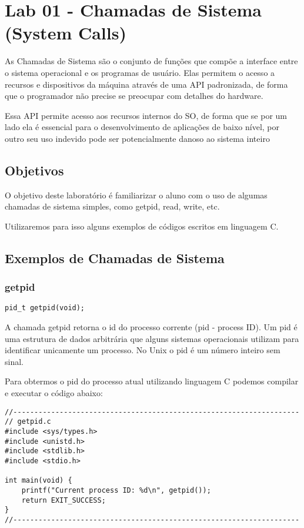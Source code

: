 \chapter{Lab 01 - Chamadas de Sistema (System Calls)}

As Chamadas de Sistema são o conjunto de funções que compõe a interface entre o sistema operacional e os programas de usuário. Elas permitem o acesso a recursos e dispositivos da máquina através de uma API padronizada, de forma que o programador não precise se preocupar com detalhes do hardware.

Essa API permite acesso aos recursos internos do SO, de forma que se por um lado ela é essencial para o desenvolvimento de aplicações de baixo nível, por outro seu uso indevido pode ser potencialmente danoso ao sistema inteiro \cite{Mitchell}

\section{Objetivos}

O objetivo deste laboratório é familiarizar o aluno com o uso de algumas chamadas de sistema simples, como getpid, read, write, etc.

Utilizaremos para isso alguns exemplos de códigos escritos em linguagem C.

\section{Exemplos de Chamadas de Sistema}

\subsection{getpid}

\begin{verbatim}
pid_t getpid(void);
\end{verbatim}

A chamada getpid retorna o id do processo corrente (pid - process ID)\cite{Man}. Um pid é uma estrutura de dados arbitrária que alguns sistemas operacionais utilizam para identificar unicamente um processo. No Unix o pid é um número inteiro sem sinal.

Para obtermos o pid do processo atual utilizando linguagem C podemos compilar e executar o código abaixo:

\newpage

\begin{espacosimples}
\begin{verbatim}
//--------------------------------------------------------------------
// getpid.c
#include <sys/types.h>
#include <unistd.h>
#include <stdlib.h>
#include <stdio.h>

int main(void) {
    printf("Current process ID: %d\n", getpid());
    return EXIT_SUCCESS;
}
//--------------------------------------------------------------------
\end{verbatim}
\end{espacosimples}

